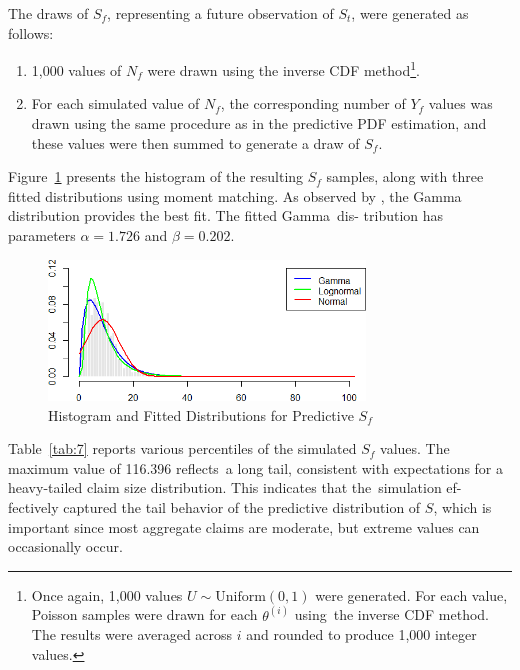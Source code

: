 \documentclass{Class/julia}
\begin{document}
The draws of \( S_f \), representing a future observation of \( S_t \), were generated as follows:

\begin{enumerate}
\item 1,000 values of \( N_f \) were drawn using the inverse CDF method\footnote{Once again, 1,000 values \( U \sim \mathrm{Uniform}(0, 1) \) were generated. For each value, Poisson samples were drawn for each \( \theta^{(i)} \) using~the inverse CDF method. The results were averaged across \( i \) and rounded to produce 1,000 integer values.}.
\item For each simulated value of \( N_f \), the corresponding number of \( Y_f \) values was drawn using the same procedure as in the predictive PDF estimation, and these values were then summed to generate a draw of \( S_f \).
\end{enumerate}

\noindent Figure~\ref{fig:10} presents the histogram of the resulting \( S_f \) samples, along with three fitted distributions using moment matching. As observed by \citet{dudley2006bayesian}, the Gamma distribution provides the best fit. The fitted Gamma~dis- tribution has parameters \( \alpha = 1.726 \) and \( \beta = 0.202 \).

\begin{figure}[!ht]
\centering
\caption{Histogram and Fitted Distributions for Predictive \( S_f \)}
\label{fig:10}
\includegraphics[width=0.75\textwidth]{rytgaard1990/predictive_S_f.png}
\end{figure}

Table~\ref{tab:7} reports various percentiles of the simulated \( S_f \) values. The maximum value of 116.396 reflects~a long tail, consistent with expectations for a heavy-tailed claim size distribution. This indicates that the~simulation ef- fectively captured the tail behavior of the predictive distribution of \( S \), which is important since most aggregate claims are moderate, but extreme values can occasionally occur.
\end{document}

